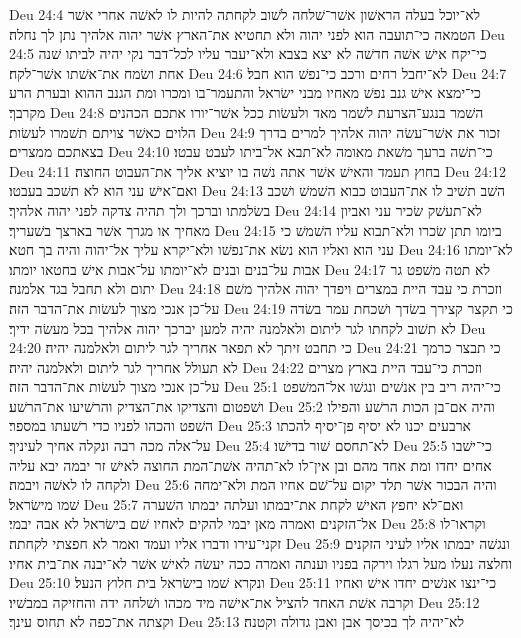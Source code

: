 Deu 24:4  לא־יוכל בעלה הראשׁון אשׁר־שׁלחה לשׁוב לקחתה להיות לו לאשׁה אחרי אשׁר הטמאה כי־תועבה הוא לפני יהוה ולא תחטיא את־הארץ אשׁר יהוה אלהיך נתן לך נחלה׃
Deu 24:5  כי־יקח אישׁ אשׁה חדשׁה לא יצא בצבא ולא־יעבר עליו לכל־דבר נקי יהיה לביתו שׁנה אחת ושׂמח את־אשׁתו אשׁר־לקח׃
Deu 24:6  לא־יחבל רחים ורכב כי־נפשׁ הוא חבל׃
Deu 24:7  כי־ימצא אישׁ גנב נפשׁ מאחיו מבני ישׂראל והתעמר־בו ומכרו ומת הגנב ההוא ובערת הרע מקרבך׃
Deu 24:8  השׁמר בנגע־הצרעת לשׁמר מאד ולעשׂות ככל אשׁר־יורו אתכם הכהנים הלוים כאשׁר צויתם תשׁמרו לעשׂות׃
Deu 24:9  זכור את אשׁר־עשׂה יהוה אלהיך למרים בדרך בצאתכם ממצרים׃
Deu 24:10  כי־תשׁה ברעך משׁאת מאומה לא־תבא אל־ביתו לעבט עבטו׃
Deu 24:11  בחוץ תעמד והאישׁ אשׁר אתה נשׁה בו יוציא אליך את־העבוט החוצה׃
Deu 24:12  ואם־אישׁ עני הוא לא תשׁכב בעבטו׃
Deu 24:13  השׁב תשׁיב לו את־העבוט כבוא השׁמשׁ ושׁכב בשׂלמתו וברכך ולך תהיה צדקה לפני יהוה אלהיך׃
Deu 24:14  לא־תעשׁק שׂכיר עני ואביון מאחיך או מגרך אשׁר בארצך בשׁעריך׃
Deu 24:15  ביומו תתן שׂכרו ולא־תבוא עליו השׁמשׁ כי עני הוא ואליו הוא נשׂא את־נפשׁו ולא־יקרא עליך אל־יהוה והיה בך חטא׃
Deu 24:16  לא־יומתו אבות על־בנים ובנים לא־יומתו על־אבות אישׁ בחטאו יומתו׃
Deu 24:17  לא תטה משׁפט גר יתום ולא תחבל בגד אלמנה׃
Deu 24:18  וזכרת כי עבד היית במצרים ויפדך יהוה אלהיך משׁם על־כן אנכי מצוך לעשׂות את־הדבר הזה׃
Deu 24:19  כי תקצר קצירך בשׂדך ושׁכחת עמר בשׂדה לא תשׁוב לקחתו לגר ליתום ולאלמנה יהיה למען יברכך יהוה אלהיך בכל מעשׂה ידיך׃
Deu 24:20  כי תחבט זיתך לא תפאר אחריך לגר ליתום ולאלמנה יהיה׃
Deu 24:21  כי תבצר כרמך לא תעולל אחריך לגר ליתום ולאלמנה יהיה׃
Deu 24:22  וזכרת כי־עבד היית בארץ מצרים על־כן אנכי מצוך לעשׂות את־הדבר הזה׃
Deu 25:1  כי־יהיה ריב בין אנשׁים ונגשׁו אל־המשׁפט ושׁפטום והצדיקו את־הצדיק והרשׁיעו את־הרשׁע׃
Deu 25:2  והיה אם־בן הכות הרשׁע והפילו השׁפט והכהו לפניו כדי רשׁעתו במספר׃
Deu 25:3  ארבעים יכנו לא יסיף פן־יסיף להכתו על־אלה מכה רבה ונקלה אחיך לעיניך׃
Deu 25:4  לא־תחסם שׁור בדישׁו׃
Deu 25:5  כי־ישׁבו אחים יחדו ומת אחד מהם ובן אין־לו לא־תהיה אשׁת־המת החוצה לאישׁ זר יבמה יבא עליה ולקחה לו לאשׁה ויבמה׃
Deu 25:6  והיה הבכור אשׁר תלד יקום על־שׁם אחיו המת ולא־ימחה שׁמו מישׂראל׃
Deu 25:7  ואם־לא יחפץ האישׁ לקחת את־יבמתו ועלתה יבמתו השׁערה אל־הזקנים ואמרה מאן יבמי להקים לאחיו שׁם בישׂראל לא אבה יבמי׃
Deu 25:8  וקראו־לו זקני־עירו ודברו אליו ועמד ואמר לא חפצתי לקחתה׃
Deu 25:9  ונגשׁה יבמתו אליו לעיני הזקנים וחלצה נעלו מעל רגלו וירקה בפניו וענתה ואמרה ככה יעשׂה לאישׁ אשׁר לא־יבנה את־בית אחיו׃
Deu 25:10  ונקרא שׁמו בישׂראל בית חלוץ הנעל׃
Deu 25:11  כי־ינצו אנשׁים יחדו אישׁ ואחיו וקרבה אשׁת האחד להציל את־אישׁה מיד מכהו ושׁלחה ידה והחזיקה במבשׁיו׃
Deu 25:12  וקצתה את־כפה לא תחוס עינך׃
Deu 25:13  לא־יהיה לך בכיסך אבן ואבן גדולה וקטנה׃
